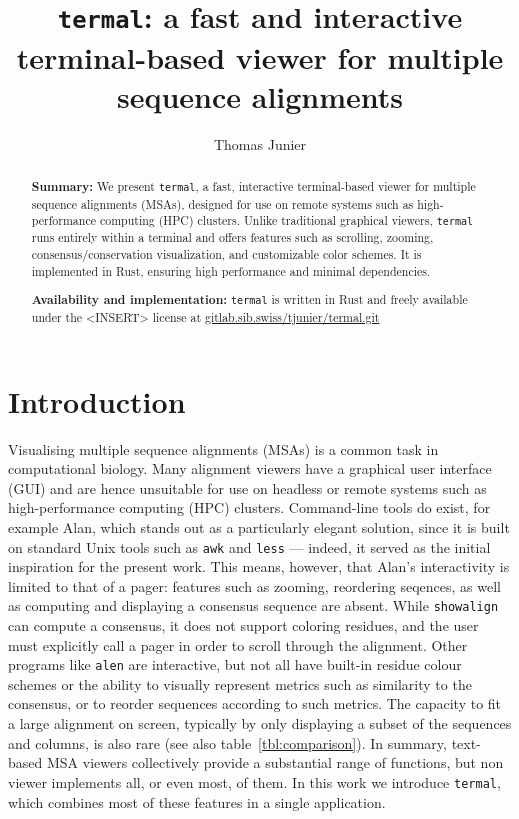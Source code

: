 \documentclass[11pt]{article}
\title{%
\texttt{termal}: a fast and interactive terminal-based viewer for multiple sequence alignments
}
\author[1]{Thomas Junier}
\affil[1]{Swiss Institute of Bioinformatics, Vital-\textsc{it} Group, Bâtiment
Amphipôle, Quartier UNIL-Sorge, CH-1015 Lausanne, Switzerland\\
\texttt{thomas.junier@sib.swiss}}
\date{} %
\begin{document}
\maketitle

\begin{abstract} \textbf{Summary:} We present \texttt{termal}, a fast,
  interactive terminal-based viewer for multiple sequence alignments (MSAs),
  designed for use on remote systems such as high-performance computing (HPC)
  clusters. Unlike traditional graphical viewers, \texttt{termal} runs entirely
  within a terminal and offers features such as scrolling, zooming,
  consensus/conservation visualization, and customizable color schemes. It is
  implemented in Rust, ensuring high performance and minimal dependencies.

	\textbf{Availability and implementation:} \texttt{termal} is written in Rust
	and freely available under the <INSERT> license at
	\url{gitlab.sib.swiss/tjunier/termal.git}

\end{abstract}

\section*{Introduction}

Visualising multiple sequence alignments (MSAs) is a common task in
computational biology. Many alignment viewers have a graphical user interface
(GUI) and are hence unsuitable for use on headless or remote systems such as
high-performance computing (HPC) clusters.  Command-line tools do exist, for
example Alan\cite{alan}, which stands out as a particularly elegant solution,
since it is built on standard Unix tools such as \texttt{awk} and \texttt{less}
--- indeed, it served as the initial inspiration for the present work. This
means, however, that Alan's interactivity is limited to that of a pager:
features such as zooming, reordering seqences, as well as computing and
displaying a consensus sequence are absent. While
\texttt{showalign}\cite{emboss} can compute a consensus, it does not support
coloring residues, and the user must explicitly call a pager in order to scroll
through the alignment. Other programs like \texttt{alen}\cite{alen} are
interactive, but not all have built-in residue colour schemes or the ability to
visually represent metrics such as similarity to the consensus, or to reorder
sequences according to such metrics. The capacity to fit a large alignment on
screen, typically by only displaying a subset of the sequences and columns, is
also rare (see also table~\ref{tbl:comparison}). In summary, text-based MSA
viewers collectively provide a substantial range of functions, but non viewer
implements all, or even most, of them. In this work we introduce
\texttt{termal}, which combines most of these features in a single application.
\end{document}
